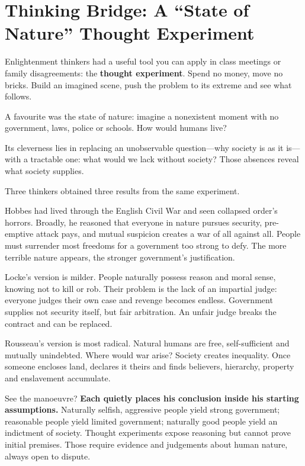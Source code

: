 \section[Thinking Bridge: The State of Nature]{Thinking Bridge: A ``State of Nature'' Thought Experiment}
Enlightenment thinkers had a useful tool you can apply in class meetings or family disagreements: the \textbf{thought experiment}. Spend no money, move no bricks. Build an imagined scene, push the problem to its extreme and see what follows.

A favourite was the state of nature: imagine a nonexistent moment with no government, laws, police or schools. How would humans live?

Its cleverness lies in replacing an unobservable question---why society is as it is---with a tractable one: what would we lack without society? Those absences reveal what society supplies.

Three thinkers obtained three results from the same experiment.

Hobbes had lived through the English Civil War and seen collapsed order's horrors. Broadly, he reasoned that everyone in nature pursues security, pre-emptive attack pays, and mutual suspicion creates a war of all against all. People must surrender most freedoms for a government too strong to defy. The more terrible nature appears, the stronger government's justification.

Locke's version is milder. People naturally possess reason and moral sense, knowing not to kill or rob. Their problem is the lack of an impartial judge: everyone judges their own case and revenge becomes endless. Government supplies not security itself, but fair arbitration. An unfair judge breaks the contract and can be replaced.

Rousseau's version is most radical. Natural humans are free, self-sufficient and mutually unindebted. Where would war arise? Society creates inequality. Once someone encloses land, declares it theirs and finds believers, hierarchy, property and enslavement accumulate.

See the manoeuvre? \textbf{Each quietly places his conclusion inside his starting assumptions.} Naturally selfish, aggressive people yield strong government; reasonable people yield limited government; naturally good people yield an indictment of society. Thought experiments expose reasoning but cannot prove initial premises. Those require evidence and judgements about human nature, always open to dispute.

